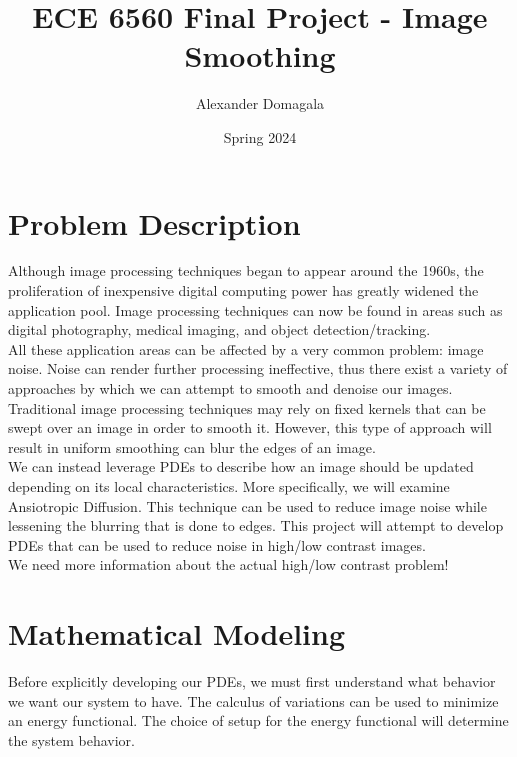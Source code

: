 \documentclass{article}
\title{\textbf{ECE 6560 Final Project - Image Smoothing}}
\author{Alexander Domagala}
\date{Spring 2024}
\begin{document}
  \maketitle

  \section{Problem Description}
  Although image processing techniques began to appear around the 1960s, the proliferation of inexpensive
  digital computing power has greatly widened the application pool. Image processing techniques
  can now be found in areas such as digital photography, medical imaging, and object detection/tracking.
  \\

  \noindent
  All these application areas can be affected by a very common problem: image noise.
  Noise can render further processing ineffective, thus there exist a variety of approaches by which
  we can attempt to smooth and denoise our images. Traditional image processing techniques
  may rely on fixed kernels that can be swept over an image in order to smooth it. However,
  this type of approach will result in uniform smoothing can blur the edges of an image.
  \\

  \noindent
  We can instead leverage PDEs to describe how an image should be updated depending on its local characteristics.
  More specifically, we will examine Ansiotropic Diffusion. This technique can be used to reduce image noise
  while lessening the blurring that is done to edges. This project will attempt to develop PDEs that
  can be used to reduce noise in high/low contrast images.
  \\

  \noindent
  We need more information about the actual high/low contrast problem!
  \\



  \newpage
  \section{Mathematical Modeling}
  Before explicitly developing our PDEs, we must first understand what behavior we want our system to have.
  The calculus of variations can be used to minimize an energy functional. The choice of setup for the
  energy functional will determine the system behavior.
  \\
\end{document}
